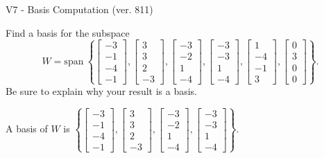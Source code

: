 \begin{exercise}
  \begin{exerciseTitle}V7 - Basis Computation (ver. 811)\end{exerciseTitle}
  \begin{exerciseStatement}
    Find a basis for the subspace 
\[W=\mathrm{span}\ \left\{\left[\begin{array}{r}
-3 \\
-1 \\
-4 \\
-1
\end{array}\right] , \left[\begin{array}{r}
3 \\
3 \\
2 \\
-3
\end{array}\right] , \left[\begin{array}{r}
-3 \\
-2 \\
1 \\
-4
\end{array}\right] , \left[\begin{array}{r}
-3 \\
-3 \\
1 \\
-4
\end{array}\right] , \left[\begin{array}{r}
1 \\
-4 \\
-1 \\
3
\end{array}\right] , \left[\begin{array}{r}
0 \\
3 \\
0 \\
0
\end{array}\right]\right\}.\]
 Be sure to explain why your result is a basis.


  \end{exerciseStatement}
  \begin{exerciseAnswer}
   A basis of \(W\) is  \(\left\{\left[\begin{array}{r}
-3 \\
-1 \\
-4 \\
-1
\end{array}\right] , \left[\begin{array}{r}
3 \\
3 \\
2 \\
-3
\end{array}\right] , \left[\begin{array}{r}
-3 \\
-2 \\
1 \\
-4
\end{array}\right] , \left[\begin{array}{r}
-3 \\
-3 \\
1 \\
-4
\end{array}\right]\right\}\).
  


  \end{exerciseAnswer}
\end{exercise}